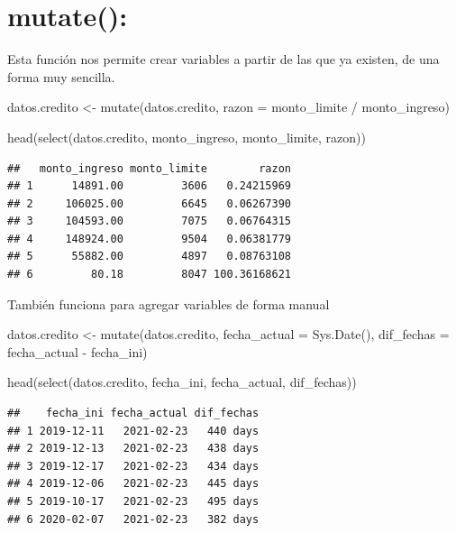 \documentclass[
  12pt,
]{book}
\newenvironment{Shaded}{\begin{snugshade}}{\end{snugshade}}
\newcommand{\AttributeTok}[1]{\textcolor[rgb]{0.77,0.63,0.00}{#1}}
\newcommand{\FunctionTok}[1]{\textcolor[rgb]{0.00,0.00,0.00}{#1}}
\newcommand{\NormalTok}[1]{#1}
\newcommand{\OtherTok}[1]{\textcolor[rgb]{0.56,0.35,0.01}{#1}}
\newcommand{\SpecialCharTok}[1]{\textcolor[rgb]{0.00,0.00,0.00}{#1}}
\begin{document}
\hypertarget{mutate}{%
\section{\texorpdfstring{\textbf{mutate()}:}{mutate():}}\label{mutate}}

Esta función nos permite crear variables a partir de las que ya existen, de una forma muy sencilla.

\begin{Shaded}
\begin{Highlighting}[]
\NormalTok{datos.credito }\OtherTok{\textless{}{-}} \FunctionTok{mutate}\NormalTok{(datos.credito, }\AttributeTok{razon =}\NormalTok{ monto\_limite }\SpecialCharTok{/}\NormalTok{ monto\_ingreso)}

\FunctionTok{head}\NormalTok{(}\FunctionTok{select}\NormalTok{(datos.credito, monto\_ingreso, monto\_limite, razon))}
\end{Highlighting}
\end{Shaded}

\begin{verbatim}
##   monto_ingreso monto_limite        razon
## 1      14891.00         3606   0.24215969
## 2     106025.00         6645   0.06267390
## 3     104593.00         7075   0.06764315
## 4     148924.00         9504   0.06381779
## 5      55882.00         4897   0.08763108
## 6         80.18         8047 100.36168621
\end{verbatim}

También funciona para agregar variables de forma manual

\begin{Shaded}
\begin{Highlighting}[]
\NormalTok{datos.credito }\OtherTok{\textless{}{-}} \FunctionTok{mutate}\NormalTok{(datos.credito, }\AttributeTok{fecha\_actual =} \FunctionTok{Sys.Date}\NormalTok{(), }\AttributeTok{dif\_fechas =}\NormalTok{ fecha\_actual }\SpecialCharTok{{-}}\NormalTok{ fecha\_ini)}

\FunctionTok{head}\NormalTok{(}\FunctionTok{select}\NormalTok{(datos.credito, fecha\_ini, fecha\_actual, dif\_fechas))}
\end{Highlighting}
\end{Shaded}

\begin{verbatim}
##    fecha_ini fecha_actual dif_fechas
## 1 2019-12-11   2021-02-23   440 days
## 2 2019-12-13   2021-02-23   438 days
## 3 2019-12-17   2021-02-23   434 days
## 4 2019-12-06   2021-02-23   445 days
## 5 2019-10-17   2021-02-23   495 days
## 6 2020-02-07   2021-02-23   382 days
\end{verbatim}
\end{document}
